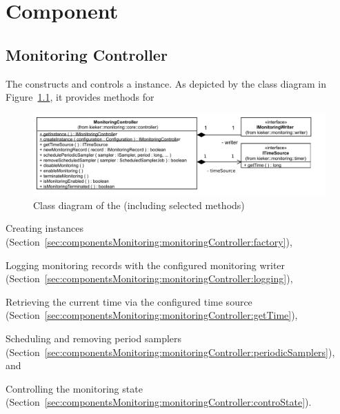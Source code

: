 %


\chapter{\KiekerMonitoringPart{} Component}\label{chap:componentsMonitoring}


\section{Monitoring Controller}\label{sec:componentsMonitoring:monitoringController}

The  constructs and controls a \KiekerMonitoringPart{} %
instance. As depicted by the class diagram in Figure~\ref{fig:monitoringController:classdiagram}, it provides methods for\\

\enlargethispage{1cm}

\begin{figure}\centering %
\includegraphics[scale=0.7]{images/kieker_monitoringControlleruserguide-simplified}
\caption{Class diagram of the  (including selected methods)}
\label{fig:monitoringController:classdiagram}
\end{figure}

\begin{compactitem}
 \item Creating  instances (Section~\ref{sec:componentsMonitoring:monitoringController:factory}),
 \item Logging monitoring records with the configured monitoring writer (Section~\ref{sec:componentsMonitoring:monitoringController:logging}),
 \item Retrieving the current time via the configured time source (Section~\ref{sec:componentsMonitoring:monitoringController:getTime}),
 \item Scheduling and removing period samplers (Section~\ref{sec:componentsMonitoring:monitoringController:periodicSamplers}), and
 \item Controlling the monitoring state (Section~\ref{sec:componentsMonitoring:monitoringController:controState}).
\end{compactitem}

